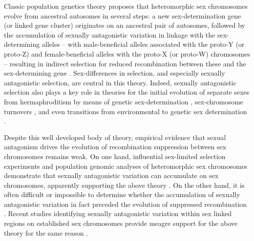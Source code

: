 \documentclass{article}[12pt]
\begin{document}
Classic population genetics theory proposes that heteromorphic sex chromosomes evolve from ancestral autosomes in several steps: a new sex-determination gene (or linked gene cluster) originates on an ancestral pair of autosomes, followed by the accumulation of sexually antagonistic variation in linkage with the sex-determining alleles -- with male-beneficial alleles associated with the proto-Y (or proto-Z) and female-beneficial alleles with the proto-X (or proto-W) chromosomes -- resulting in indirect selection for reduced recombination between these and the sex-determining gene \citep{Fisher1931, Nei1969, Charlesworth1980, Bull1983, Rice1987, Lenormand2003, CharlesworthMarais2005}. Sex-differences in selection, and especially sexually antagonistic selection, are central in this theory. Indeed, sexually antagonistic selection also plays a key role in theories for the initial evolution of separate sexes from hermaphroditism by means of genetic sex-determination \citep{Charlesworth1978a, Charlesworth1978b, Bull1983, Olito2019}, sex-chromosome turnovers \citep{vanDoornKirkpatrick2007,vanDoornKirkpatrick2010,OttoScottOsmond2018}, and even transitions from environmental to genetic sex determination \citep{MuralidharVeller2018}. 

Despite this well developed body of theory, empirical evidence that sexual antagonism drives the evolution of recombination suppression between sex chromosomes remains weak. On one hand, influential sex-limited selection experiments and population genomic analyses of heteromorphic sex chromosomes demonstrate that sexually antagonistic variation can accumulate on sex chromosomes, apparently supporting the above theory \cite[e.g.,][]{Rice1992,Chippindale2001,Gibson2002, ZhouBachtrog2012,QiuBergeroCharlesworth2013}. On the other hand, it is often difficult or impossible to determine whether the accumulation of sexually antagonistic variation in fact preceded the evolution of suppressed recombination \citep{Charlesworth1980, Rice1984, Ironside2010, Ponnikas2018}. Recent studies identifying sexually antagonistic variation within sex linked regions on established sex chromosomes provide meagre support for the above theory for the same reason \cite[e.g.][]{BergeroCharlesworth2009,QiuBergeroCharlesworth2013,KirkpatrickGuerrero2014, Wright2017, BergeroCharlesworth2019}.
\end{document}
